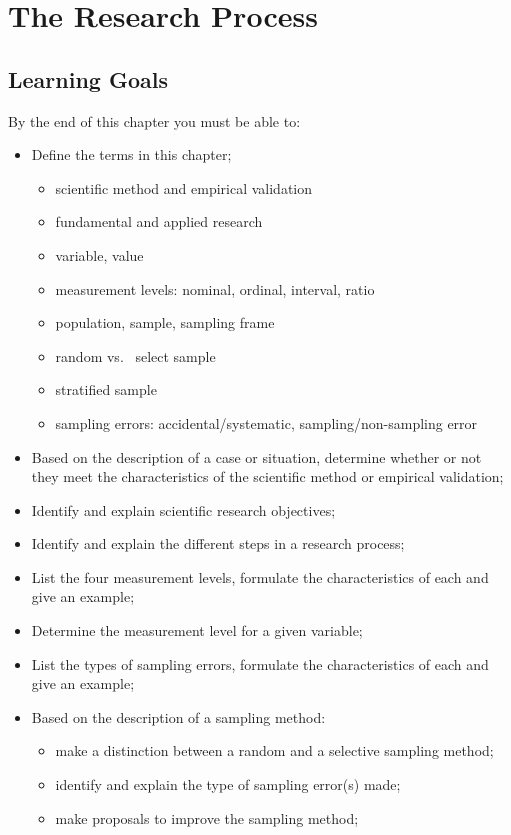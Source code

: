 \chapter{The Research Process}
\label{ch:research_process}

\section{Learning Goals}
\label{sec:onderzoeksproces-leerdoelen}

By the end of this chapter you must be able to:

\begin{itemize}
    \item Define the terms in this chapter;
    \begin{itemize}
        \item scientific method and empirical validation
        \item fundamental and applied research
        \item variable, value
        \item measurement levels: nominal, ordinal, interval, ratio
        \item population, sample, sampling frame
        \item random vs.~ select sample
        \item stratified sample
        \item sampling errors: accidental/systematic, sampling/non-sampling error
    \end{itemize}
    \item Based on the description of a case or situation, determine whether or not they meet the characteristics of the scientific method or empirical validation;
    \item Identify and explain scientific research objectives;
    \item Identify and explain the different steps in a research process;
    \item List the four measurement levels, formulate the characteristics of each and give an example;
    \item Determine the measurement level for a given variable;
    \item List the types of sampling errors, formulate the characteristics of each and give an example;
    \item Based on the description of a sampling method:
    \begin{itemize}
        \item make a distinction between a random and a selective sampling method;
        \item identify and explain the type of sampling error(s) made;
        \item make proposals to improve the sampling method;
    \end{itemize}
\end{itemize}

